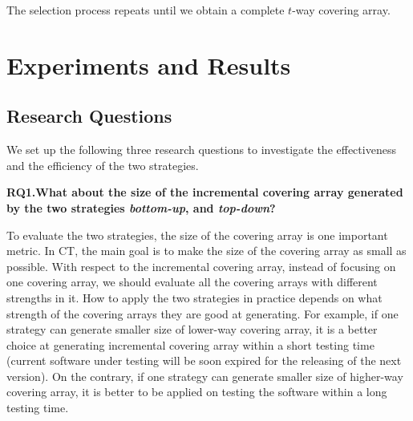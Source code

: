 \documentclass[conference]{IEEEtran}
\theoremstyle{definition}
\begin{document}
The selection process repeats until we obtain a complete $t$-way covering array.




\section{Experiments and Results}
\subsection{Research Questions}
We set up the following three research questions to investigate the effectiveness and the efficiency of the two strategies.

\textbf{RQ1.What about the size of the incremental covering array generated by the two strategies \emph{bottom-up}, and \emph{top-down}?}

To evaluate the two strategies, the size of the covering array is one important metric. In CT, the main goal is to make the size of the covering array as small as possible. With respect to the incremental covering array, instead of focusing on one covering array, we should evaluate all the covering arrays with different strengths in it. How to apply the two strategies in practice depends on what strength of the covering arrays they are good at generating. For example, if one strategy can generate smaller size of lower-way covering array, it is a better choice at generating incremental covering array within a short testing time (current software under testing will be soon expired for the releasing of the next version). On the contrary, if one strategy can generate smaller size of higher-way covering array, it is better to be applied on testing the software within a long testing time.
\end{document}
